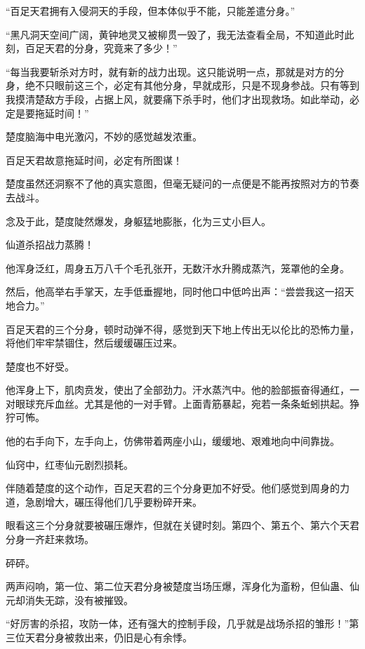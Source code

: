 
\begin{this_body}

“百足天君拥有入侵洞天的手段，但本体似乎不能，只能差遣分身。”

“黑凡洞天空间广阔，黄钟地灵又被柳贯一毁了，我无法查看全局，不知道此时此刻，百足天君的分身，究竟来了多少！”

“每当我要斩杀对方时，就有新的战力出现。这只能说明一点，那就是对方的分身，绝不只眼前这三个，必定有其他分身，早就成形，只是不现身参战。只有等到我摸清楚敌方手段，占据上风，就要痛下杀手时，他们才出现救场。如此举动，必定是要拖延时间！”

楚度脑海中电光激闪，不妙的感觉越发浓重。

百足天君故意拖延时间，必定有所图谋！

楚度虽然还洞察不了他的真实意图，但毫无疑问的一点便是不能再按照对方的节奏去战斗。

念及于此，楚度陡然爆发，身躯猛地膨胀，化为三丈小巨人。

仙道杀招战力蒸腾！

他浑身泛红，周身五万八千个毛孔张开，无数汗水升腾成蒸汽，笼罩他的全身。

然后，他高举右手掌天，左手低垂握地，同时他口中低吟出声：“尝尝我这一招天地合力。”

百足天君的三个分身，顿时动弹不得，感觉到天下地上传出无以伦比的恐怖力量，将他们牢牢禁锢住，然后缓缓碾压过来。

楚度也不好受。

他浑身上下，肌肉贲发，使出了全部劲力。汗水蒸汽中。他的脸部振奋得通红，一对眼球充斥血丝。尤其是他的一对手臂。上面青筋暴起，宛若一条条蚯蚓拱起。狰狞可怖。

他的右手向下，左手向上，仿佛带着两座小山，缓缓地、艰难地向中间靠拢。

仙窍中，红枣仙元剧烈损耗。

伴随着楚度的这个动作，百足天君的三个分身更加不好受。他们感觉到周身的力道，急剧增大，碾压得他们几乎要粉碎开来。

眼看这三个分身就要被碾压爆炸，但就在关键时刻。第四个、第五个、第六个天君分身一齐赶来救场。

砰砰。

两声闷响，第一位、第二位天君分身被楚度当场压爆，浑身化为齑粉，但仙蛊、仙元却消失无踪，没有被摧毁。

“好厉害的杀招，攻防一体，还有强大的控制手段，几乎就是战场杀招的雏形！”第三位天君分身被救出来，仍旧是心有余悸。


\end{this_body}
